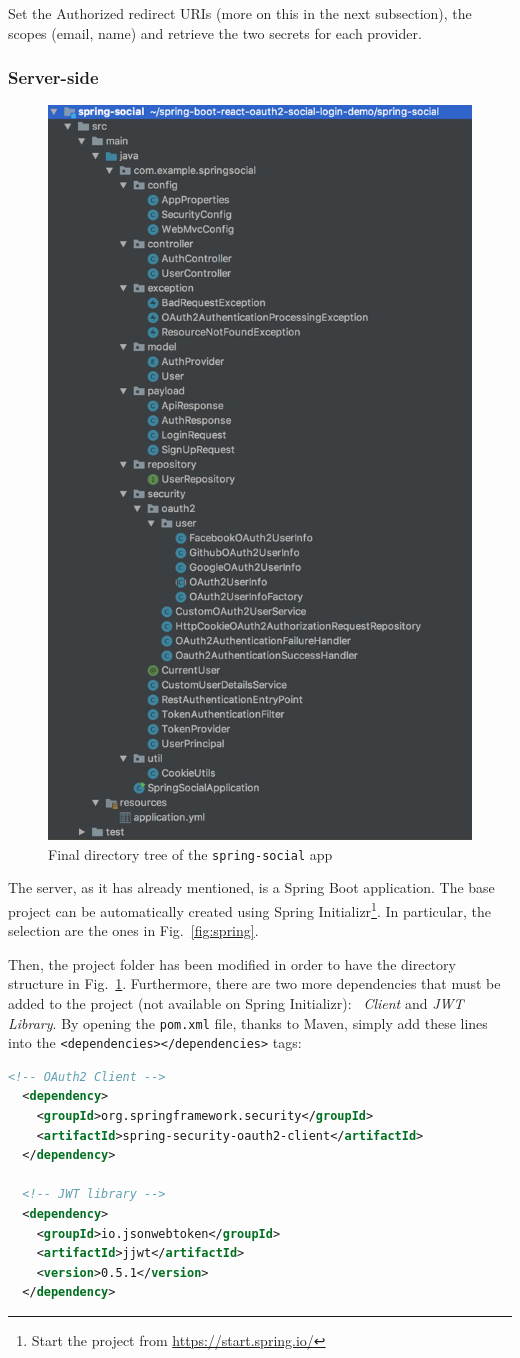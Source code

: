 \noindent Set the Authorized redirect URIs (more on this in the next subsection), the scopes (email, name) and retrieve the two secrets for each provider.

\subsubsection{Server-side}

\begin{figure}
  \begin{center}
    \includegraphics[width=0.3 \textwidth]{chapters/images/chp6/springdir.jpg}
  \end{center}
  \caption{Final directory tree of the \texttt{spring-social} app}
  \label{fig:dirsocial}
\end{figure}

The server, as it has already mentioned, is a Spring Boot application. The base project can be automatically created using Spring Initializr\footnote{Start the project from \url{https://start.spring.io/}}. In particular, the selection are the ones in Fig.~\ref{fig:spring}.

Then, the project folder has been modified in order to have the directory structure in Fig.~\ref{fig:dirsocial}. Furthermore, there are two more dependencies that must be added to the project (not available on Spring Initializr): \textit{\oauth\ Client} and \textit{JWT Library}. By opening the \texttt{pom.xml} file, thanks to Maven, simply add these lines into the \texttt{<dependencies></dependencies>} tags:

\begin{lstlisting}[language=XML, basicstyle=\fontsize{9}{11}\ttfamily]
  <!-- OAuth2 Client -->
  <dependency>
    <groupId>org.springframework.security</groupId>
    <artifactId>spring-security-oauth2-client</artifactId>
  </dependency>

  <!-- JWT library -->
  <dependency>
    <groupId>io.jsonwebtoken</groupId>
    <artifactId>jjwt</artifactId>
    <version>0.5.1</version>
  </dependency>
\end{lstlisting}

